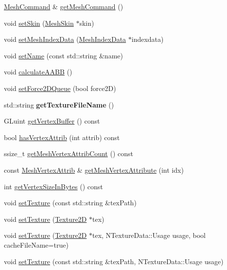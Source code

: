 \begin{DoxyCompactItemize}
\hyperlink{classMeshCommand}{Mesh\+Command} \& \hyperlink{classMesh_a39c778124e07dc3e23613b78e9f717c4}{get\+Mesh\+Command} ()
\item 
void \hyperlink{classMesh_a5af01fd336373b86c3f3f092f7eb03ec}{set\+Skin} (\hyperlink{classMeshSkin}{Mesh\+Skin} $\ast$skin)
\item 
void \hyperlink{classMesh_ab9bbc073beb34fd8bd5b5b0f973a4fe2}{set\+Mesh\+Index\+Data} (\hyperlink{classMeshIndexData}{Mesh\+Index\+Data} $\ast$indexdata)
\item 
void \hyperlink{classMesh_ab944b018efbf265dc7555d793e50b4fd}{set\+Name} (const std\+::string \&name)
\item 
void \hyperlink{classMesh_aceba31e4566e9369d03a169c3742eb0f}{calculate\+A\+A\+BB} ()
\item 
void \hyperlink{classMesh_aac7eb18692391478f6bbb0a9937b86fd}{set\+Force2\+D\+Queue} (bool force2D)
\item 
\mbox{\label{classMesh_aabe0b489915c74fb8565c6aee2d62b77}} 
std\+::string {\bfseries get\+Texture\+File\+Name} ()
\item 
G\+Luint \hyperlink{classMesh_a6424c1f70f73adcc51b23cee023b00c4}{get\+Vertex\+Buffer} () const
\item 
bool \hyperlink{classMesh_adb4449d816ec9935e576cdf99a18b7c1}{has\+Vertex\+Attrib} (int attrib) const
\item 
ssize\+\_\+t \hyperlink{classMesh_afc2d755d1c586b16983e951d1c0af38b}{get\+Mesh\+Vertex\+Attrib\+Count} () const
\item 
const \hyperlink{structMeshVertexAttrib}{Mesh\+Vertex\+Attrib} \& \hyperlink{classMesh_a3f74344b90bbb184d016767a10b17ef3}{get\+Mesh\+Vertex\+Attribute} (int idx)
\item 
int \hyperlink{classMesh_ac76eaa9d09b9198494e48c4323ae1628}{get\+Vertex\+Size\+In\+Bytes} () const
\item 
void \hyperlink{classMesh_a2840f1e3e43c12acf51af1e34398a9a2}{set\+Texture} (const std\+::string \&tex\+Path)
\item 
void \hyperlink{classMesh_aa3492c9c06f12e024e2b7e1ec6258e0a}{set\+Texture} (\hyperlink{classTexture2D}{Texture2D} $\ast$tex)
\item 
void \hyperlink{classMesh_ae39c726ae3c302a5f6bcf8cb31ee7897}{set\+Texture} (\hyperlink{classTexture2D}{Texture2D} $\ast$tex, N\+Texture\+Data\+::\+Usage usage, bool cache\+File\+Name=true)
\item 
void \hyperlink{classMesh_ac5afa042166c9f976551fb638611eb12}{set\+Texture} (const std\+::string \&tex\+Path, N\+Texture\+Data\+::\+Usage usage)

\end{DoxyCompactItemize}
